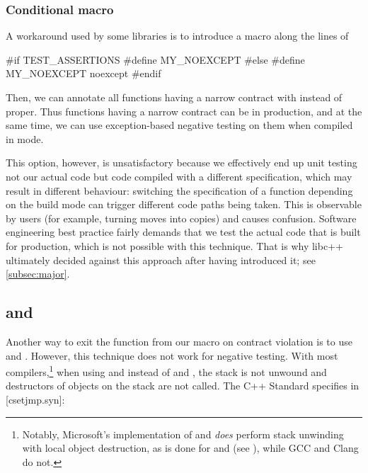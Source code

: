 \subsubsection{Conditional  macro}
\label{subsubsec:conditional}

A workaround used by some libraries is to introduce a macro along the lines of
\begin{codeblock}
#if TEST_ASSERTIONS
  #define MY_NOEXCEPT 
#else
  #define MY_NOEXCEPT noexcept
#endif
\end{codeblock}
Then, we can annotate all functions having a narrow contract with  instead of  proper. Thus functions having a narrow contract can be  in production, and at the same time, we can use exception-based negative testing on them when compiled in \mbox{} mode.

This option, however, is unsatisfactory because we effectively end up unit testing not our actual code but code compiled with a different specification, which may result in different behaviour: switching the  specification of a function depending on the build mode can trigger different code paths being taken. This is observable by users (for example, turning moves into copies) and causes confusion. Software engineering best practice fairly demands that we test the actual code that is built for production, which is not possible with this technique. That is why libc++ ultimately decided against this approach after having introduced it; see \ref{subsec:major}.

\subsection{ and }

Another way to exit the function from our  macro on contract violation is to use  and . However, this technique does not work for negative testing. With most compilers,\footnote{Notably, Microsoft's implementation of  and  \emph{does} perform stack unwinding with local object destruction, as is done for  and  (see \cite{MSVCDocLongjmp}), while GCC and Clang do not.} when using  and  instead of  and , the stack is not unwound and destructors of objects on the stack are not called. The C++ Standard specifies in [csetjmp.syn]:

